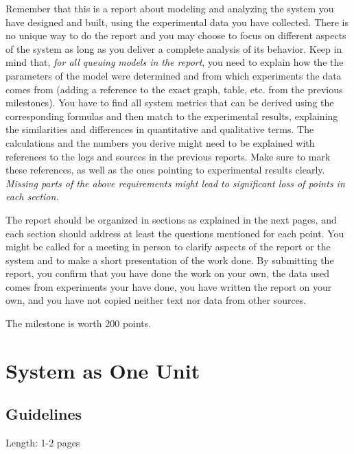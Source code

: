 \documentclass[11pt]{article}
\begin{document}
Remember  that  this is  a  report  about modeling  and  analyzing the  system you  have  designed  and  built, using  the experimental data you have collected. There is no unique way to do the report and you may choose  to  focus  on  different  aspects  of  the  system  as  long  as  you deliver a  complete analysis of  its behavior. Keep in mind that, \emph{for all queuing models in the report}, you need to explain how the the parameters of the model were determined and from which experiments the data comes from (adding a reference to the exact graph, table, etc. from the previous milestones). You have to find all system metrics that can be derived using the corresponding formulas and then match to the experimental results, explaining the similarities and differences in quantitative and qualitative terms. The calculations and the numbers you derive might need to be explained with references to the logs and sources in the previous reports. Make sure to mark these references, as well as the ones pointing to experimental results clearly. \textit{Missing parts of the above requirements might lead to significant loss of points in each section.}

The report should be organized in sections as explained in the next pages, and each section should address at least the questions mentioned for each point. You might be called for a meeting in person to clarify aspects of the report or the system and to make a short presentation of the work done. By submitting the report, you  confirm  that  you  have  done  the  work  on  your  own,  the  data used comes  from  experiments  your have  done,  you  have  written  the  report  on  your  own,  and  you have  not  copied  neither text nor data from other sources.

\medskip
The milestone is worth 200 points. 

\pagebreak

\clearpage
\section{System as One Unit}\label{sec:system-one-unit}

\subsection{Guidelines}
Length: 1-2 pages
\end{document}
